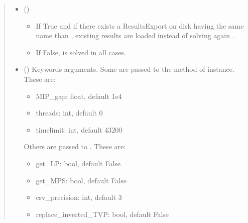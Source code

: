 \documentclass[letterpaper,10pt,english]{sphinxmanual}
\begin{document}
\begin{fulllineitems}
\begin{fulllineitems}
\begin{quote}
\begin{description}
\begin{itemize}
\item {} 
\sphinxAtStartPar
{} (\sphinxstyleliteralemphasis{\sphinxupquote{, }}\sphinxstyleliteralemphasis{\sphinxupquote{, }}) \textendash{} \begin{itemize}
\item {} 
\sphinxAtStartPar
If True and if there exists a ResultsExport on disk having the same name than ,
existing results are loaded instead of solving again .

\item {} 
\sphinxAtStartPar
If False,  is solved in all cases.

\end{itemize}


\item {} 
\sphinxAtStartPar
{} () \textendash{} 
\sphinxAtStartPar
Keywords arguments.
Some are passed to the  method of  instance. These are:
\begin{itemize}
\item {} 
\sphinxAtStartPar
MIP\_gap: float, default 1e\sphinxhyphen{}4

\item {} 
\sphinxAtStartPar
threads: int, default 0

\item {} 
\sphinxAtStartPar
timelimit: int, default 43200

\end{itemize}

\sphinxAtStartPar
Others are passed to . These are:
\begin{itemize}
\item {} 
\sphinxAtStartPar
get\_LP: bool, default False

\item {} 
\sphinxAtStartPar
get\_MPS: bool, default False

\item {} 
\sphinxAtStartPar
csv\_precision: int, default 3

\item {} 
\sphinxAtStartPar
replace\_inverted\_TVP: bool, default False


\end{itemize}
\end{itemize}
\end{description}
\end{quote}
\end{fulllineitems}
\end{fulllineitems}
\end{document}
